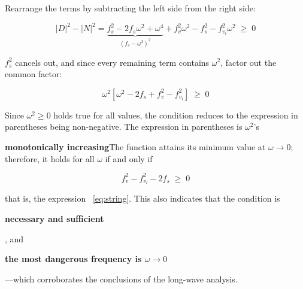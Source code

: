\documentclass[11pt,a4paper,openany]{book}
\numberwithin{equation}{chapter}
\numberwithin{figure}{chapter}
\numberwithin{table}{chapter}
\begin{document}
Rearrange the terms by subtracting the left side from the right side:

\begin{equation}
\left|D\right|^2 - \left|N\right|^2
= \underbrace{f_s^2 - 2f_s\omega^2 + \omega^4}_{\left(f_s-\omega^2\right)^2} + f_v^2\omega^2 - f_s^2 - f_{v_l}^2\omega^2 \;\ge\; 0
\end{equation}




$f_s^2$ cancels out, and since every remaining term contains $\omega^2$, factor out the common factor:

\begin{equation}
\omega^2\left[\omega^2 - 2f_s + f_v^2 - f_{v_l}^2\right] \;\ge\; 0
\label{eq:bracket}
\end{equation}




Since $\omega^2\ge0$ holds true for all values, the condition reduces to the expression in parentheses being non-negative. The expression in parentheses is $\omega^2$’s




\textbf{monotonically increasing}The function attains its minimum value at $\omega\to0$; therefore, it holds for all $\omega$ if and only if

\begin{equation}
f_v^2 - f_{v_l}^2 - 2f_s \;\ge\; 0
\end{equation}




that is, the expression ~\eqref{eq:string}. This also indicates that the condition is




\textbf{necessary and sufficient}




, and




\textbf{the most dangerous frequency is $\omega\to0$}




—which corroborates the conclusions of the long-wave analysis.
\end{document}
